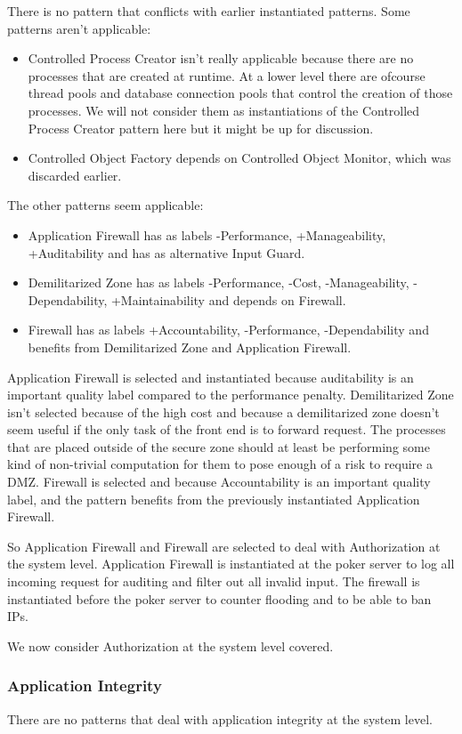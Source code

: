 \documentclass[a4paper,11pt]{report}
\begin{document}
There is no pattern that conflicts with earlier instantiated patterns.
Some patterns aren't applicable:
\begin{itemize}
\item Controlled Process Creator isn't really applicable because there are no processes that are created at runtime.
At a lower level there are ofcourse thread pools and database connection pools that control the creation of those
processes. We will not consider them as instantiations of the Controlled Process Creator pattern here but it
might be up for discussion.
\item Controlled Object Factory depends on Controlled Object Monitor, which was discarded earlier.
\end{itemize}
The other patterns seem applicable:
\begin{itemize}
\item Application Firewall has as labels -Performance, +Manageability, +Auditability and has as alternative Input Guard.
\item Demilitarized Zone has as labels -Performance, -Cost, -Manageability, -Dependability, +Maintainability and depends
on Firewall.
\item Firewall has as labels +Accountability, -Performance, -Dependability and benefits from Demilitarized Zone and
Application Firewall.
\end{itemize}

Application Firewall is selected and instantiated because auditability is an important quality label compared to
the performance penalty.
Demilitarized Zone isn't selected because of the high cost and because a demilitarized zone doesn't seem useful if the only task of the front end is to forward request. The processes that are placed outside of the secure zone should at least be performing some kind of non-trivial computation for them to pose enough of a risk to require a DMZ.
Firewall is selected and because Accountability is an important quality label, and the pattern benefits
from the previously instantiated Application Firewall.

So Application Firewall and Firewall are selected to deal with Authorization at the system level. Application Firewall is instantiated at the poker server to log all incoming request for auditing and filter out all invalid input. The firewall is instantiated before the poker server to counter flooding and to be able to ban IPs.

We now consider Authorization at the system level covered.
\subsubsection{Application Integrity}
There are no patterns that deal with application integrity at the system level.
\end{document}
